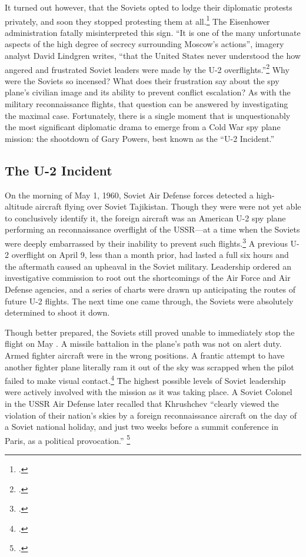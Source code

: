 \documentclass{report}
\begin{document}
\begin{refsegment}
It turned out however, that the Soviets opted to lodge their diplomatic protests privately, and soon they stopped protesting them at all.\footcite[p.~42]{lindgren_trust_2000} The Eisenhower administration fatally misinterpreted this sign. ``It is one of the many unfortunate aspects of the high degree of secrecy surrounding Moscow's actions'', imagery analyst David Lindgren writes, ``that the United States never understood the how angered and frustrated Soviet leaders were made by the U-2 overflights.''\footcite[p.~52]{lindgren_trust_2000} Why were the Soviets so incensed? What does their frustration say about the spy plane's civilian image and its ability to prevent conflict escalation? As with the military reconnaissance flights, that question can be answered by investigating the maximal case. Fortunately, there is a single moment that is unquestionably the most significant diplomatic drama to emerge from a Cold War spy plane mission: the shootdown of Gary Powers, best known as the ``U-2 Incident.''

\subsection{The U-2 Incident}
On the morning of May 1, 1960, Soviet Air Defense forces detected a high-altitude aircraft flying over Soviet Tajikistan. Though they were were not yet able to conclusively identify it, the foreign aircraft was an American U-2 spy plane performing an reconnaissance overflight of the USSR---at a time when the Soviets were deeply embarrassed by their inability to prevent such flights.\footcite{orlov_u-2_2007} A previous U-2 overflight on April 9, less than a month prior, had lasted a full six hours and the aftermath caused an upheaval in the Soviet military. Leadership ordered an investigative commission to root out the shortcomings of the Air Force and Air Defense agencies, and a series of charts were drawn up anticipating the routes of future U-2 flights. The next time one came through, the Soviets were absolutely determined to shoot it down.

Though better prepared, the Soviets still proved unable to immediately stop the flight on May . A missile battalion in the plane's path was not on alert duty. Armed fighter aircraft were in the wrong positions. A frantic attempt to have another fighter plane literally ram it out of the sky was scrapped when the pilot failed to make visual contact.\footcite{orlov_u-2_2007} The highest possible levels of Soviet leadership were actively involved with the mission as it was taking place. A Soviet Colonel in the USSR Air Defense later recalled that Khrushchev ``clearly viewed the violation of their nation's skies by a foreign reconnaissance aircraft on the day of a Soviet national holiday, and just two weeks before a summit conference in Paris, as a political provocation.'' \footcite{orlov_u-2_2007}


\end{refsegment}
\end{document}
